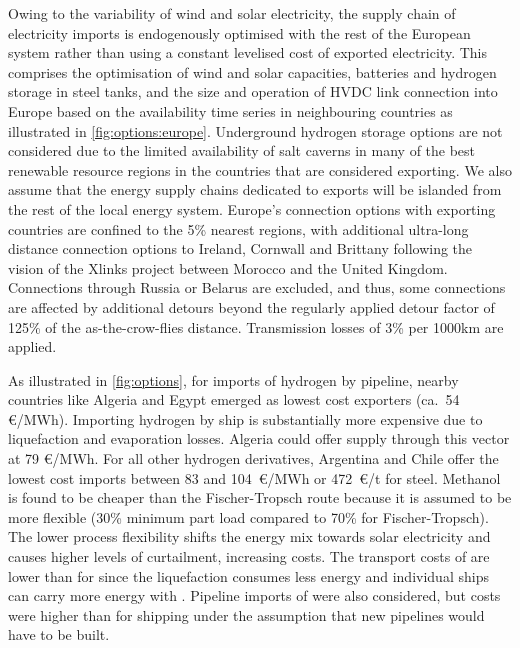 Owing to the variability of wind and solar electricity, the supply chain of
electricity imports is endogenously optimised with the rest of the European
system rather than using a constant levelised cost of exported electricity. This
comprises the optimisation of wind and solar capacities, batteries and hydrogen
storage in steel tanks, and the size and operation of HVDC link connection into
Europe based on the availability time series in neighbouring countries as
illustrated in \cref{fig:options:europe}. Underground hydrogen storage options are
not considered due to the limited availability of salt caverns in many of the
best renewable resource regions in the countries that are considered
exporting.\cite{hevinUndergroundStorage2019} We also assume that the energy
supply chains dedicated to exports will be islanded from the rest of the local
energy system. Europe's connection options with exporting countries are confined
to the 5\% nearest regions, with additional ultra-long distance connection
options to Ireland, Cornwall and Brittany following the vision of the Xlinks
project between Morocco and the United Kingdom.\cite{xlinksMoroccoUKPower2023}
Connections through Russia or Belarus are excluded, and thus, some connections
are affected by additional detours beyond the regularly applied detour factor
of 125\% of the as-the-crow-flies distance. Transmission losses of 3\% per 1000km are
applied.


As illustrated in \cref{fig:options}, for imports of hydrogen by pipeline,
nearby countries like Algeria and Egypt emerged as lowest cost exporters (ca.~54
\euro{}/MWh). Importing hydrogen by ship is substantially more expensive due to
liquefaction and evaporation losses. Algeria could offer supply through this
vector at 79 \euro{}/MWh. For all other hydrogen derivatives, Argentina and
Chile offer the lowest cost imports between 83 and 104~\euro{}/MWh or
472~\euro{}/t for steel. Methanol is found to be cheaper than the
Fischer-Tropsch route because it is assumed to be more flexible (30\% minimum
part load compared to 70\% for
Fischer-Tropsch).\cite{brownUltralongdurationEnergy2023} The lower process
flexibility shifts the energy mix towards solar electricity and causes higher
levels of curtailment, increasing costs. The transport costs of 
are lower than for  since the liquefaction consumes less energy and
individual ships can carry more energy with . Pipeline imports of
 were also considered, but costs were higher than for
 shipping under the assumption that new pipelines would have to be
built.



